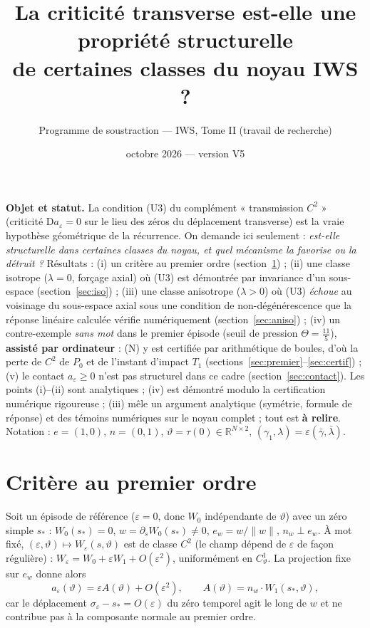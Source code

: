 \documentclass[11pt,a4paper]{article}
\title{La criticité transverse est-elle une propriété structurelle\\ de certaines classes du noyau IWS ?}
\author{Programme de soustraction --- IWS, Tome II (travail de recherche)}
\date{octobre 2026 --- version V5}
\theoremstyle{remark}
\newcommand{\R}{\mathbb R}
\newcommand{\vth}{\vartheta}
\newcommand{\D}{\mathrm D}
\begin{document}
\maketitle

\noindent\textbf{Objet et statut.} La condition (U3) du complément « transmission $C^2$ » (criticité $\D a_\varepsilon=0$ sur le lieu des zéros du déplacement transverse) est la vraie hypothèse géométrique de la récurrence. On demande ici seulement : \emph{est-elle structurelle dans certaines classes du noyau, et quel mécanisme la favorise ou la détruit ?} Résultats : (i) un critère au premier ordre (section~\ref{sec:A}) ; (ii) une classe isotrope ($\lambda=0$, forçage axial) où (U3) est démontrée par invariance d'un sous-espace (section~\ref{sec:iso}) ; (iii) une classe anisotrope ($\lambda>0$) où (U3) \emph{échoue} au voisinage du sous-espace axial sous une condition de non-dégénérescence que la réponse linéaire calculée vérifie numériquement (section~\ref{sec:aniso}) ; (iv) un contre-exemple \emph{sans mot} dans le premier épisode (seuil de pression $\Theta=\frac{11}5$), \textbf{assisté par ordinateur} : (N) y est certifiée par arithmétique de boules, d'où la perte de $C^2$ de $P_0$ et de l'instant d'impact $T_1$ (sections~\ref{sec:premier}--\ref{sec:certif}) ; (v) le contact $a_\varepsilon\ge0$ n'est pas structurel dans ce cadre (section~\ref{sec:contact}). Les points (i)--(ii) sont analytiques ; (iv) est démontré modulo la certification numérique rigoureuse ; (iii) mêle un argument analytique (symétrie, formule de réponse) et des témoins numériques sur le noyau complet ; tout est \textbf{à relire}. Notation : $e=(1,0)$, $n=(0,1)$, $\vth=\tau(0)\in\R^{N\times2}$, $(\gamma_1,\lambda)=\varepsilon(\bar\gamma,\bar\lambda)$.

\section{Critère au premier ordre}\label{sec:A}
Soit un épisode de référence ($\varepsilon=0$, donc $W_0$ indépendante de $\vth$) avec un zéro simple $s_*$ : $W_0(s_*)=0$, $w=\partial_sW_0(s_*)\ne0$, $e_w=w/\lVert w\rVert$, $n_w\perp e_w$. À mot fixé, $(\varepsilon,\vth)\mapsto W_\varepsilon(s,\vth)$ est de classe $C^2$ (le champ dépend de $\varepsilon$ de façon régulière) : $W_\varepsilon=W_0+\varepsilon W_1+O(\varepsilon^2)$, uniformément en $C^1_\vth$. La projection fixe sur $e_w$ donne alors
\begin{equation}\label{eq:A}
a_\varepsilon(\vth)=\varepsilon A(\vth)+O(\varepsilon^2),\qquad A(\vth)=n_w\cdot W_1(s_*,\vth),
\end{equation}
car le déplacement $\sigma_\varepsilon-s_*=O(\varepsilon)$ du zéro temporel agit le long de $w$ et ne contribue pas à la composante normale au premier ordre.
\end{document}
